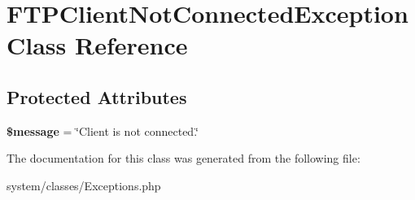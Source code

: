 \hypertarget{class_f_t_p_client_not_connected_exception}{
\section{FTPClientNotConnectedException Class Reference}
\label{class_f_t_p_client_not_connected_exception}
}
\subsection*{Protected Attributes}
\begin{DoxyCompactItemize}
\item 
\hypertarget{class_f_t_p_client_not_connected_exception_abf17cb2dba2ed17cb28aa5f37deb5293}{
{\bfseries \$message} = \char`\"{}Client is not connected.\char`\"{}}
\label{class_f_t_p_client_not_connected_exception_abf17cb2dba2ed17cb28aa5f37deb5293}

\end{DoxyCompactItemize}


The documentation for this class was generated from the following file:\begin{DoxyCompactItemize}
\item 
system/classes/Exceptions.php\end{DoxyCompactItemize}
